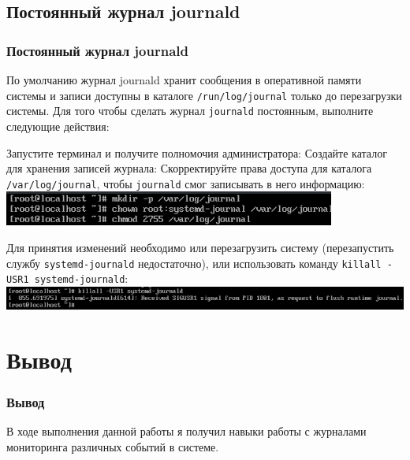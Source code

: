\documentclass{beamer}
\begin{document}
\subsection{Постоянный журнал journald}
\begin{frame}[plain]
	\frametitle{Постоянный журнал journald}
	По умолчанию журнал journald хранит сообщения в оперативной памяти системы и записи доступны в каталоге \texttt{/run/log/journal} только до перезагрузки системы. Для того чтобы сделать журнал \texttt{journald} постоянным, выполните следующие действия:
\end{frame}
\begin{frame}[plain]
	Запустите терминал и получите полномочия администратора:
	Создайте каталог для хранения записей журнала:
	\label{access} Скорректируйте права доступа для каталога \texttt{/var/log/journal}, чтобы \texttt{journald} смог записывать в него информацию:
	\\\includegraphics{24.png}
\end{frame}
\begin{frame}[plain]
	Для принятия изменений необходимо или перезагрузить систему (перезапустить службу \texttt{systemd-journald} недостаточно), или использовать команду \texttt{killall -USR1 systemd-journald}:
	\\\includegraphics{25.png}
\end{frame}

\section{Вывод}
\begin{frame}[plain]
	\frametitle{Вывод}
	В ходе выполнения данной работы я получил навыки работы с журналами мониторинга различных событий в системе.
\end{frame}
\end{document}
